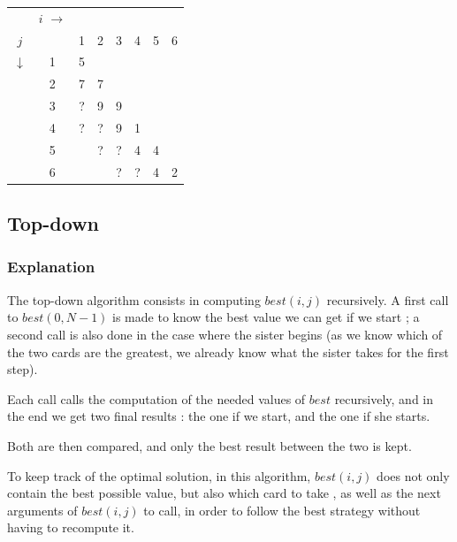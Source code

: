 \documentclass[11pt]{article}
\begin{document}
	\begin{tabular}[c]{cc|cccccc}
		& $i$ $\rightarrow$\\

		$j$          &   & 1 & 2 & 3 & 4 & 5 & 6 \\
		             \cline{2-8}
					 $\downarrow$ & 1 & 5 & \cellcolor{black!10} & \cellcolor{black!10} & \cellcolor{black!10} & \cellcolor{black!10} & \cellcolor{black!10} \\
		             & 2 & 7 & 7 & \cellcolor{black!10} & \cellcolor{black!10} & \cellcolor{black!10} & \cellcolor{black!10} \\
		             & 3 & ? & 9 & 9 & \cellcolor{black!10} & \cellcolor{black!10} & \cellcolor{black!10} \\
		             & 4 & ? & ? & 9 & 1 & \cellcolor{black!10} & \cellcolor{black!10} \\
					 & 5 & \color{myred}{\textbf{?}} & ? & ? & 4 & 4 & \cellcolor{black!10} \\
					 & 6 & \color{myred}{\textbf{?}} & \color{myred}{\textbf{?}} & ? & ? & 4 & 2
		
	\end{tabular}
	\hspace{2cm}
	\begin{minipage}{5cm}
	\end{minipage}

\subsection{Top-down}
\subsubsection{Explanation}
The top-down algorithm consists in computing $best(i, j)$ recursively.
A first call to $best(0, N-1)$ is made to know the best value we can get
if we start ; a second call is also done in the case where the sister begins
(as we know which of the two cards are the greatest, we already know what the
sister takes for the first step).

Each call calls the computation of the needed values of $best$ recursively, and
in the end we get two final results : the one if we start,
and the one if she starts.

Both are then compared, and only the best result between the two is kept.

To keep track of the optimal solution, in this algorithm, $best(i, j)$ does not
only contain the best possible value, but also which card to take
, as well as the next arguments of $best(i, j)$ to call, 
in order to follow the best strategy without having to recompute it.
\end{document}
